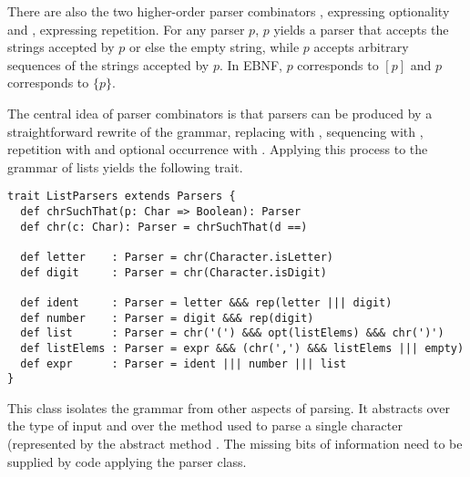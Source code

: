 {{There are also the two higher-order parser combinators ,
expressing optionality and , expressing repetition.
For any parser $p$, $p$\code{)} yields a parser that
accepts the strings accepted by $p$ or else the empty string, while
$p$\code{)} accepts arbitrary sequences of the strings accepted by
$p$. In EBNF, $p$\code{)} corresponds to $[p]$ and
$p$\code{)} corresponds to $\{p\}$.

The central idea of parser combinators is that parsers can be produced
by a straightforward rewrite of the grammar, replacing \code{::=} with
\code{=}, sequencing with
\code{&}, repetition  with
 and optional occurrence \code{[...]} with .
Applying this process to the grammar of lists
yields the following trait.
\begin{lstlisting}
trait ListParsers extends Parsers {
  def chrSuchThat(p: Char => Boolean): Parser
  def chr(c: Char): Parser = chrSuchThat(d ==)

  def letter    : Parser = chr(Character.isLetter)
  def digit     : Parser = chr(Character.isDigit)

  def ident     : Parser = letter &&& rep(letter ||| digit)
  def number    : Parser = digit &&& rep(digit)
  def list      : Parser = chr('(') &&& opt(listElems) &&& chr(')')
  def listElems : Parser = expr &&& (chr(',') &&& listElems ||| empty)
  def expr      : Parser = ident ||| number ||| list
}
\end{lstlisting}
This class isolates the grammar from other aspects of parsing. It
abstracts over the type of input 
and over the method used to parse a single character
(represented by the abstract method . The missing bits of information need to be supplied by code
applying the parser class.

}}
